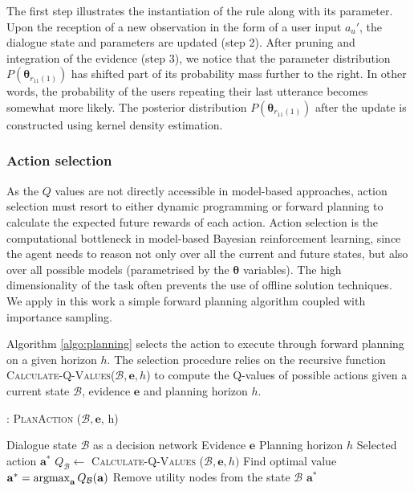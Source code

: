 The first step illustrates the instantiation of the rule along with its parameter. Upon the reception of a new observation in the form of a user input $a_u'$, the dialogue state and parameters are updated (step 2). After pruning and integration of the evidence (step 3), we notice that the parameter distribution $P(\boldsymbol\theta_{r_{11}(1)})$ has shifted part of its probability mass further to the right. In other words, the probability of the users repeating their last utterance becomes somewhat more likely. The posterior distribution $P(\boldsymbol\theta_{r_{11}(1)})$ after the update is constructed using kernel density estimation. 

\subsubsection*{Action selection}

 As the $Q$ values are not directly accessible in model-based approaches, action selection must resort to either dynamic programming or forward planning to calculate the expected future rewards of each action.  Action selection is the computational bottleneck in model-based Bayesian reinforcement learning, since the agent needs to reason not only over all the current and future states, but also over all possible models (parametrised by the $\boldsymbol\theta$ variables).  The high dimensionality of the task often prevents the use of offline solution techniques. We apply in this work a simple forward planning algorithm coupled with importance sampling. 

Algorithm \ref{algo:planning} selects the action to execute through forward planning on a given horizon $h$.  The selection procedure relies on the recursive function \textsc{Calculate-Q-Values}($\mathcal{B}, \mathbf{e}, h$) to compute the Q-values of possible actions given a current state $\mathcal{B}$, evidence $\mathbf{e}$ and planning horizon $h$.  

\begin{algorithm}[h!]
\caption{: \textsc{PlanAction} ($\mathcal{B}, \mathbf{e}$, h) }
\begin{algorithmic}[1] \vspace{1mm}
\REQUIRE Dialogue state $\mathcal{B}$ as a decision network
\REQUIRE Evidence $\mathbf{e}$
\REQUIRE Planning horizon $h$
\ENSURE Selected action $\mathbf{a}^*$
\STATE $Q_{\mathcal{B}} \leftarrow $ \textsc{Calculate-Q-Values} ($\mathcal{B}, \mathbf{e}, h)$
\STATE Find optimal value $\mathbf{a}^* = \argmax_{\mathbf{a}} Q_{\mathcal{B}}(\mathbf{a})$
\STATE Remove utility nodes from the state $\mathcal{B}$
\RETURN $\mathbf{a}^*$
\end{algorithmic}
\label{algo:planning}
\end{algorithm}


